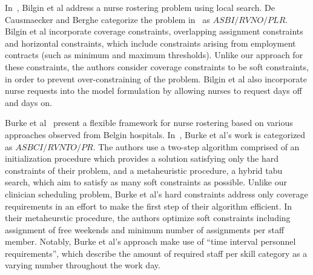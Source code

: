 In~\cite{bilgin_local_2012}, Bilgin et al address a nurse rostering problem using local search.
De Causmaecker and Berghe categorize the problem in~\cite{bilgin_local_2012} as $ASBI/RVNO/PLR$.
Bilgin et al incorporate coverage constraints, overlapping assignment constraints
and horizontal constraints, which include constraints arising from employment contracts
(such as minimum and maximum thresholds).
Unlike our approach for these constraints, the authors consider coverage constraints to be soft
constraints, in order to prevent over-constraining of the problem.
Bilgin et al also incorporate nurse requests into the model formulation by allowing
nurses to request days off and days on.

Burke et al~\cite{burke_metaheuristics_2006} present a flexible framework for nurse rostering based on various approaches
observed from Belgin hospitals. 
In~\cite{de_causmaecker_categorisation_2011}, Burke et al's work is categorized as $ASBCI/RVNTO/PR$.
The authors use a two-step algorithm comprised of an initialization procedure
which provides a solution satisfying only the hard constraints of their problem,
and a metaheuristic procedure, a hybrid tabu search, which aim to satisfy as many soft constraints as possible.
Unlike our clinician scheduling problem, 
Burke et al's hard constraints address only coverage requirements in an effort to make the first
step of their algorithm efficient.
In their metaheurstic procedure, the authors optimize soft constraints including assignment of free weekends
and minimum number of assignments per staff member.
Notably, Burke et al's approach make use of ``time interval personnel requirements'', which describe
the amount of required staff per skill category as a varying number throughout the work day.